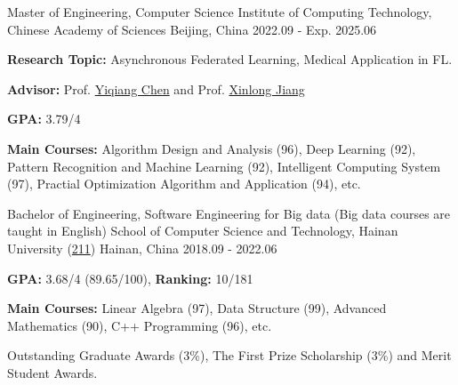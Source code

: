 
\begin{cventries}

\cventry
{Master of Engineering, Computer Science} %
{Institute of Computing Technology, Chinese Academy of Sciences} %
{Beijing, China} %
{2022.09 - Exp. 2025.06} %
{
  \begin{cvitems} %
    \item {\textbf{Research Topic:} Asynchronous Federated Learning, Medical Application in FL.}
    \item {\textbf{Advisor:} Prof. \href{https://www.ict.cas.cn/sourcedb_ict_cas/cn/jssrck/200909/t20090917_2496596.html}{Yiqiang Chen} and Prof. \href{http://english.ict.cas.cn/people/scien/bln/202303/t20230321_328588.html}{Xinlong Jiang}}
    \item {\textbf{GPA:} 3.79/4}
    \item {\textbf{Main Courses:} Algorithm Design and Analysis (96), Deep Learning (92), Pattern Recognition and Machine Learning (92), Intelligent Computing System (97), Practial Optimization Algorithm and Application (94), etc.}
  \end{cvitems}
}

\cventry
{Bachelor of Engineering, Software Engineering for Big data (Big data courses are taught in English)} %
{School of Computer Science and Technology, Hainan University (\href{https://en.wikipedia.org/wiki/Project_211}{211})} %
{Hainan, China} %
{2018.09 - 2022.06} %
{
  \begin{cvitems} %
    \item {\textbf{GPA:} 3.68/4 (89.65/100), \textbf{Ranking:} 10/181} %
    \item {\textbf{Main Courses:} Linear Algebra (97), Data Structure (99), Advanced Mathematics (90), C++ Programming (96), etc.}
    \item {Outstanding Graduate Awards (3\%), The First Prize Scholarship (3\%) and Merit Student Awards.}
  \end{cvitems}
}

\end{cventries}
